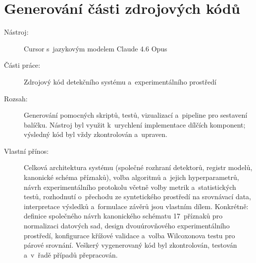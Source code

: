\section*{Generování části zdrojových kódů}

\begin{description}
\item[Nástroj:] Cursor \parencite{Cursor2026} s~jazykovým modelem Claude 4.6 Opus \parencite{Anthropic2025}
\item[Části práce:] Zdrojový kód detekčního systému a~experimentálního prostředí
\item[Rozsah:] Generování pomocných skriptů, testů, vizualizací a~pipeline pro sestavení balíčku. Nástroj byl využit k~urychlení implementace dílčích komponent; výsledný kód byl vždy zkontrolován a~upraven.
\item[Vlastní přínos:] Celková architektura systému (společné rozhraní detektorů, registr modelů, kanonické schéma příznaků), volba algoritmů a~jejich hyperparametrů, návrh experimentálního protokolu včetně volby metrik a~statistických testů, rozhodnutí o~přechodu ze syntetického prostředí na srovnávací data, interpretace výsledků a~formulace závěrů jsou vlastním dílem. Konkrétně: definice společného návrh kanonického schématu 17~příznaků pro normalizaci datových sad, design dvouúrovňového experimentálního prostředí, konfigurace křížové validace a~volba Wilcoxonova testu pro párové srovnání. Veškerý vygenerovaný kód byl zkontrolován, testován a~v~řadě případů přepracován.
\end{description}
